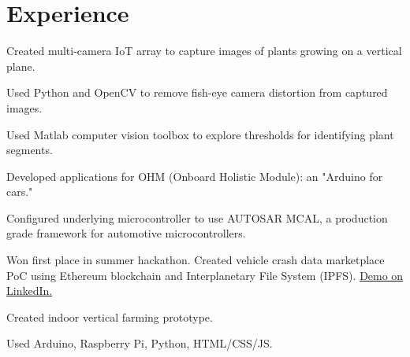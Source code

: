 \documentclass[]{deedy-resume-openfont}
\begin{document}
\begin{minipage}[t]{0.66\textwidth} 


\section{Experience}

\vspace{\topsep} %
\begin{tightemize}
\item Created multi-camera IoT array to capture images of plants growing on a vertical plane.
\item Used Python and OpenCV to remove fish-eye camera distortion from captured images.
\item Used Matlab computer vision toolbox to explore thresholds for identifying plant segments.
\end{tightemize}
\sectionsep

\begin{tightemize}%

\item Developed applications for OHM (Onboard Holistic Module): an "Arduino for cars."
 
\item Configured underlying microcontroller to use AUTOSAR MCAL, a production grade framework for automotive microcontrollers.

\item Won first place in summer hackathon. Created vehicle crash data marketplace PoC using Ethereum blockchain and Interplanetary File System (IPFS). {\href {https://www.youtube.com/watch?v=Fvz7ZRkD_6U}{Demo on LinkedIn.}}

\end{tightemize}
\sectionsep

\begin{tightemize}
\item Created indoor vertical farming prototype.
\item Used Arduino, Raspberry Pi, Python, HTML/CSS/JS.
\end{tightemize}
\sectionsep


\end{minipage}
\end{document}
